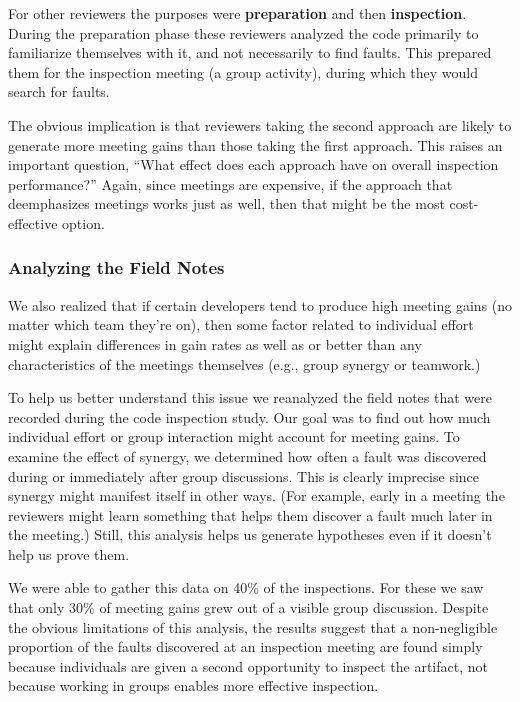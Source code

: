 For other reviewers the purposes were {\bf preparation} and then {\bf inspection}.
During the preparation phase these reviewers analyzed the code 
primarily to familiarize themselves with it, and not necessarily to find
faults. This prepared them for the inspection meeting (a group activity),
during which they would search for faults.

The obvious implication is that reviewers taking the second approach are
likely to generate more meeting gains than those taking the first approach.
This raises an important question, ``What effect does each approach have on 
overall inspection performance?'' Again, since meetings are expensive, if
the approach that deemphasizes meetings works just as well, 
then that might be the most cost-effective option.


\subsubsection{Analyzing the Field Notes}

We also realized that if certain developers tend to produce high meeting gains 
(no matter which team they're on), then some factor related to 
individual effort might explain differences in 
gain rates as well as or better than any
characteristics of the meetings themselves (e.g., group synergy or teamwork.)

To help us better understand this issue we reanalyzed the field notes that 
were recorded during the code inspection study. Our goal was to find
out how much individual effort or group interaction might account for
meeting gains.  To examine the effect of synergy, we determined
how often a fault was discovered
during or immediately after group discussions. This is clearly imprecise 
since synergy might manifest itself in other ways. (For example, early
in a meeting the reviewers might learn something that helps them
discover a fault much later in the meeting.) Still, this analysis helps us 
generate hypotheses even if it doesn't help us prove them.

We were able to gather this data on 40\% of the inspections. For these we 
saw that only 30\% of meeting gains grew out of a visible group discussion.
Despite the obvious limitations of this analysis, the results suggest that 
a non-negligible proportion of the faults discovered at an inspection meeting
are found simply because individuals are given a second opportunity to 
inspect the artifact, not because working in groups enables
more effective inspection.

